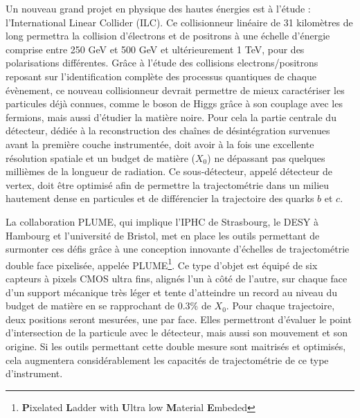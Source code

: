 \documentclass[a4papper, 10pt]{article}
\begin{document}
  Un nouveau grand projet en physique des hautes énergies est à l'étude : l'International Linear Collider (ILC). 
  Ce collisionneur linéaire de 31 kilomètres de long permettra la collision d'électrons et de positrons à une échelle d'énergie comprise entre 250 GeV et 500 GeV et ultérieurement 1 TeV, pour des polarisations différentes.
  Grâce à l'étude des collisions electrons/positrons reposant sur l'identification complète des processus quantiques de chaque évènement, ce nouveau collisionneur devrait permettre de mieux caractériser les particules déjà connues, comme le boson de Higgs grâce à son couplage avec les fermions, mais aussi d'étudier la matière noire.
  Pour cela la partie centrale du détecteur, dédiée à la reconstruction des chaînes de désintégration survenues avant la première couche instrumentée, doit avoir à la fois une excellente résolution spatiale et un budget de matière ($X_0$) ne dépassant pas quelques millièmes de la longueur de radiation. 
  Ce sous-détecteur, appelé détecteur de vertex, doit être optimisé afin de permettre la trajectométrie dans un milieu hautement dense en particules et de différencier la trajectoire des quarks $b$ et $c$.

  La collaboration PLUME, qui implique l'IPHC de Strasbourg, le DESY à Hambourg et l'université de Bristol, met en place les outils permettant de surmonter ces défis grâce à une conception innovante d'échelles de trajectométrie double face pixelisée, appelée PLUME\footnote{\textbf{P}ixelated \textbf{L}adder with \textbf{U}ltra low \textbf{M}aterial \textbf{E}mbeded}\cite{PLUME}. 
  Ce type d'objet est équipé de six capteurs à pixels CMOS ultra fins, alignés l'un à côté de l'autre, sur chaque face d'un support mécanique très léger et tente d'atteindre un record au niveau du budget de matière en se rapprochant de 0.3\% de $X_0$.
  Pour chaque trajectoire, deux positions seront mesurées, une par face. 
  Elles permettront d'évaluer le point d'intersection de la particule avec le détecteur, mais aussi son mouvement et son origine. 
  Si les outils permettant cette double mesure sont maitrisés et optimisés, cela augmentera considérablement les capacités de trajectométrie de ce type d'instrument.
\end{document}
